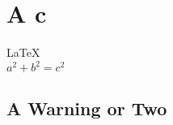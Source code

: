 \documentclass{article}
\begin{document}
               
 
\section{A  c}          
\LaTeX \,\\ 
 $a^2+b^2=c^2$

\subsection{A Warning or Two}  

\end{document}
